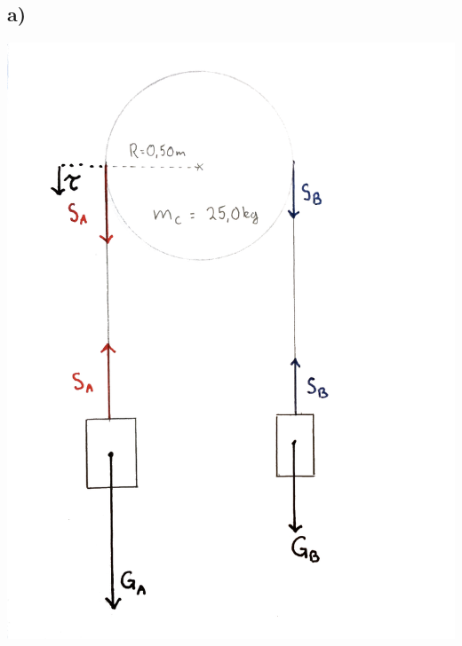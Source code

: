 \documentclass[12pt,a4paper]{article}
\begin{document}
    \subsection*{a)}
    \begin{center}
      \includegraphics[scale=0.7]{05_2a}
    \end{center}
\end{document}
